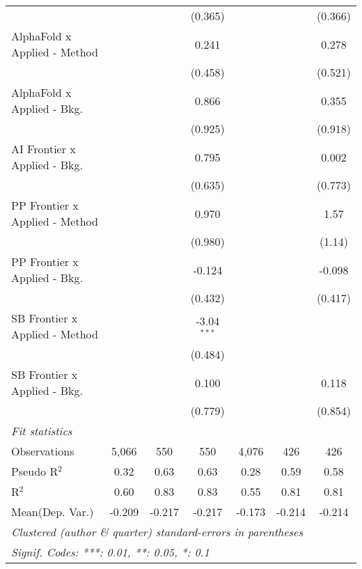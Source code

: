 \begin{tabular}{lcccccc}
                                  &         &             & (0.365)       &              &             & (0.366)\\   
   AlphaFold x Applied - Method   &         &             & 0.241         &              &             & 0.278\\   
                                  &         &             & (0.458)       &              &             & (0.521)\\   
   AlphaFold x Applied - Bkg.     &         &             & 0.866         &              &             & 0.355\\   
                                  &         &             & (0.925)       &              &             & (0.918)\\   
   AI Frontier x Applied - Bkg.   &         &             & 0.795         &              &             & 0.002\\   
                                  &         &             & (0.635)       &              &             & (0.773)\\   
   PP Frontier x Applied - Method &         &             & 0.970         &              &             & 1.57\\   
                                  &         &             & (0.980)       &              &             & (1.14)\\   
   PP Frontier x Applied - Bkg.   &         &             & -0.124        &              &             & -0.098\\   
                                  &         &             & (0.432)       &              &             & (0.417)\\   
   SB Frontier x Applied - Method &         &             & -3.04$^{***}$ &              &             &   \\   
                                  &         &             & (0.484)       &              &             &   \\   
   SB Frontier x Applied - Bkg.   &         &             & 0.100         &              &             & 0.118\\   
                                  &         &             & (0.779)       &              &             & (0.854)\\   
   \midrule
   \emph{Fit statistics}\\
   Observations                   & 5,066   & 550         & 550           & 4,076        & 426         & 426\\  
   Pseudo R$^2$                   & 0.32    & 0.63        & 0.63          & 0.28         & 0.59        & 0.58\\  
   R$^2$                          & 0.60    & 0.83        & 0.83          & 0.55         & 0.81        & 0.81\\  
Mean(Dep. Var.) & -0.209 & -0.217 & -0.217 & -0.173 & -0.214 & -0.214 \\
   \midrule \midrule
   \multicolumn{7}{l}{\emph{Clustered (author \& quarter) standard-errors in parentheses}}\\
   \multicolumn{7}{l}{\emph{Signif. Codes: ***: 0.01, **: 0.05, *: 0.1}}\\
\end{tabular}
\par\endgroup
